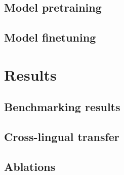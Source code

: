 \documentclass[11pt]{article}
\begin{document}
\subsection{Model pretraining}


\subsection{Model finetuning}


\section{Results}


\subsection{Benchmarking results}


\subsection{Cross-lingual transfer}


\subsection{Ablations}





\end{document}

